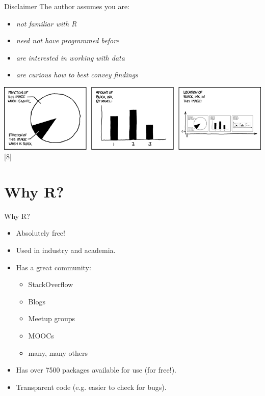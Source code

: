 \normalfont
\begin{frame}
	\begin{center}
  		\begin{block}{Disclaimer} 
The author assumes you are:
	\begin{itemize}
		\item \itshape not \normalfont familiar with \ttfamily R \normalfont 
		\item \itshape need not \normalfont have programmed before
		\item \itshape are \normalfont interested in working with data 
		\item \itshape are \normalfont curious how to best convey findings
	\end{itemize} 
	\end{block}

	       \begin{center}
	         \includegraphics[scale=0.35]{images/xkcd-self_description}[8]
	        \end{center}

	\end{center} 
\end{frame}

\section{Why R?}
\begin{frame}
	\begin{center}
  		\begin{block}{Why R?} 
			\begin{itemize}
				\item Absolutely free!
				\item Used in industry and academia.
				\item Has a great community:
					\begin{itemize}
						\item StackOverflow
						\item Blogs
						\item Meetup groups
						\item MOOCs
						\item many, many others
					\end{itemize}
				\item Has over 7500 packages available for use (for free!).
				\item Transparent code (e.g. easier to check for bugs).
			\end{itemize}
		\end{block}
	\end{center} 
\end{frame}


